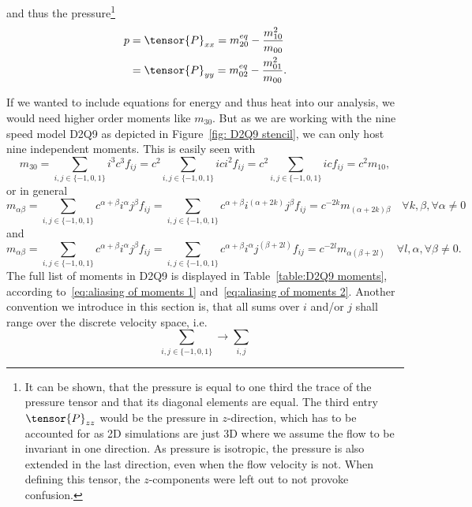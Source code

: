 and thus the pressure\footnote{It can be shown, that the pressure is equal to one third the trace of the pressure tensor and that its diagonal elements are equal. The third entry $\tensor{P}_{zz}$ would be the pressure in $z$-direction, which has to be accounted for as 2D simulations are just 3D where we assume the flow to be invariant in one direction. As pressure is isotropic, the pressure is also extended in the last direction, even when the flow velocity is not. When defining this tensor, the $z$-components were left out to not provoke confusion.}
\begin{equation}
  \label{eq: pressure}
  \begin{aligned}
    p &= \tensor{P}_{xx} = m_{20}^{eq} - \frac{m_{10}^2}{m_{00}}\\
     &= \tensor{P}_{yy} = m_{02}^{eq} - \frac{m_{01}^2}{m_{00}}.
  \end{aligned}
\end{equation}

If we wanted to include equations for energy and thus heat into our analysis, we would need higher order moments like $m_{30}$.
But as we are working with the nine speed model D2Q9 as depicted in Figure~\ref{fig: D2Q9 stencil}, we can only host nine independent moments.
This is easily seen with
\begin{equation}
  m_{30} = \sum_{i,j \in \{-1,0,1\}} i^3 c^3 f_{ij} = c^2\sum_{i,j \in \{-1,0,1\}} ic i^2 f_{ij} = c^2 \sum_{i,j \in \{-1,0,1\}} ic f_{ij} = c^2 m_{10},
\end{equation}
or in general
\begin{equation}
  \label{eq:aliasing of moments 1}
  m_{\alpha\beta}
  = \sum_{i,j \in \{-1,0,1\}} c^{\alpha+\beta} i^\alpha j^\beta f_{ij}
  = \sum_{i,j \in \{-1,0,1\}} c^{\alpha+\beta}i^{(\alpha+2k)} j^\beta f_{ij}
  = c^{-2k} m_{(\alpha+2k)\beta} \quad \forall k,\beta, \forall \alpha \neq 0
\end{equation}
and
\begin{equation}
  \label{eq:aliasing of moments 2}
  m_{\alpha\beta}
  = \sum_{i,j \in \{-1,0,1\}} c^{\alpha+\beta} i^\alpha j^\beta f_{ij}
  = \sum_{i,j \in \{-1,0,1\}} c^{\alpha+\beta}i^\alpha j^{(\beta+2l)} f_{ij}
  = c^{-2l}m_{\alpha(\beta+2l)} \quad \forall l, \alpha, \forall \beta \neq 0.
\end{equation}
The full list of moments in D2Q9 is displayed in Table~\ref{table:D2Q9 moments}, according to~\eqref{eq:aliasing of moments 1} and~\eqref{eq:aliasing of moments 2}.
Another convention we introduce in this section is, that all sums over $i$ and/or $j$ shall range over the discrete velocity space, i.e.
\begin{equation*}
  \sum_{i,j \in \{-1,0,1\}} \rightarrow \sum_{i,j}
\end{equation*}

